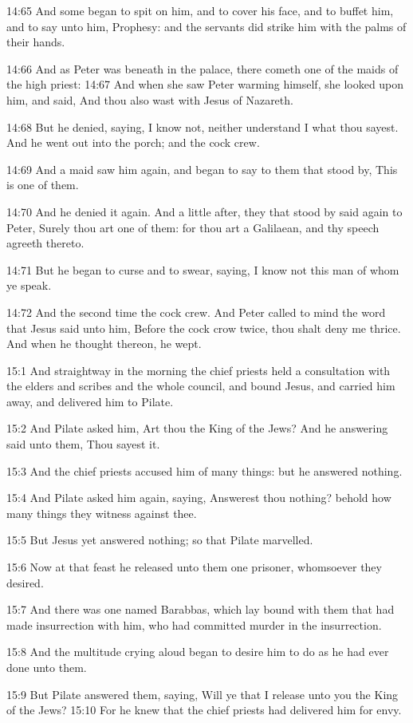 14:65 And some began to spit on him, and to cover his face, and to
buffet him, and to say unto him, Prophesy: and the servants did strike
him with the palms of their hands.

14:66 And as Peter was beneath in the palace, there cometh one of the
maids of the high priest: 14:67 And when she saw Peter warming
himself, she looked upon him, and said, And thou also wast with Jesus
of Nazareth.

14:68 But he denied, saying, I know not, neither understand I what
thou sayest. And he went out into the porch; and the cock crew.

14:69 And a maid saw him again, and began to say to them that stood
by, This is one of them.

14:70 And he denied it again. And a little after, they that stood by
said again to Peter, Surely thou art one of them: for thou art a
Galilaean, and thy speech agreeth thereto.

14:71 But he began to curse and to swear, saying, I know not this man
of whom ye speak.

14:72 And the second time the cock crew. And Peter called to mind the
word that Jesus said unto him, Before the cock crow twice, thou shalt
deny me thrice. And when he thought thereon, he wept.

15:1 And straightway in the morning the chief priests held a
consultation with the elders and scribes and the whole council, and
bound Jesus, and carried him away, and delivered him to Pilate.

15:2 And Pilate asked him, Art thou the King of the Jews? And he
answering said unto them, Thou sayest it.

15:3 And the chief priests accused him of many things: but he answered
nothing.

15:4 And Pilate asked him again, saying, Answerest thou nothing?
behold how many things they witness against thee.

15:5 But Jesus yet answered nothing; so that Pilate marvelled.

15:6 Now at that feast he released unto them one prisoner, whomsoever
they desired.

15:7 And there was one named Barabbas, which lay bound with them that
had made insurrection with him, who had committed murder in the
insurrection.

15:8 And the multitude crying aloud began to desire him to do as he
had ever done unto them.

15:9 But Pilate answered them, saying, Will ye that I release unto you
the King of the Jews?  15:10 For he knew that the chief priests had
delivered him for envy.

